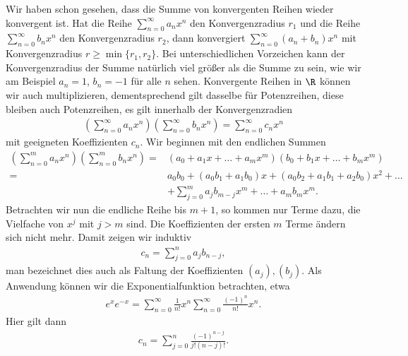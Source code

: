 \documentclass[letterpaper,10pt,english]{jupyterBook}
\begin{document}
Wir haben schon gesehen, dass die Summe von konvergenten Reihen wieder konvergent ist. Hat die Reihe \(\sum_{n=0}^\infty a_n x^n\) den Konvergenzradius \(r_1\) und die Reihe  \(\sum_{n=0}^\infty b_n x^n\) den Konvergenzradius \(r_2\), dann konvergiert  \(\sum_{n=0}^\infty (a_n+b_n) x^n\)  mit  Konvergenzradius \(r \geq \min\{r_1,r_2\}.\) Bei unterschiedlichen Vorzeichen kann der Konvergenzradius der Summe natürlich viel größer als die Summe zu sein, wie wir am Beispiel \(a_n = 1\), \(b_n = -1\) für alle \(n\) sehen.
Konvergente Reihen in \(\R\) können wir auch multiplizieren, dementsprechend gilt dasselbe für Potenzreihen, diese bleiben auch Potenzreihen, es gilt innerhalb der Konvergenzradien
\begin{equation*}
\begin{split} \left( \sum_{n=0}^\infty a_n x^n \right) \left( \sum_{n=0}^\infty b_n x^n \right) = \sum_{n=0}^\infty c_n x^n\end{split}
\end{equation*}
mit geeigneten Koeffizienten \(c_n\). Wir beginnen mit den endlichen Summen
\begin{align*}\left( \sum_{n=0}^m a_n x^n \right) \left( \sum_{n=0}^m b_n x^n \right) =& (a_0 + a_1x+ \ldots + a_m x^m)(b_0 + b_1x+ \ldots + b_m x^m) \\
=& a_0 b_0 + (a_0b_1+a_1b_0)x + (a_0 b_2 + a_1 b_1 + a_2 b_0)x^2 + \ldots \\ & + \sum_{j=0}^m a_j b_{m-j} x^m + \ldots +a_m b_m x^m .
\end{align*}
Betrachten wir nun die endliche Reihe bis \(m+1\), so kommen nur Terme dazu, die Vielfache von \(x^j\) mit \(j > m\) sind. Die Koeffizienten der ersten \(m\) Terme ändern sich nicht mehr. Damit zeigen wir induktiv
\begin{equation*}
\begin{split} c_n =  \sum_{j=0}^n a_j b_{n-j}  ,\end{split}
\end{equation*}
man bezeichnet dies auch als Faltung der Koeffizienten \((a_j), (b_j)\).
Als Anwendung können wir die Exponentialfunktion betrachten, etwa
\begin{equation*}
\begin{split} e^x e^{-x} = \sum_{n=0}^\infty \frac{1}{n!} x^n  \sum_{n=0}^\infty \frac{(-1)^n}{n!} x^n .\end{split}
\end{equation*}
Hier gilt  dann
\begin{equation*}
\begin{split} c_n =  \sum_{j=0}^n \frac{(-1)^{n-j}}{j! (n-j)!} .\end{split}
\end{equation*}
\end{document}
